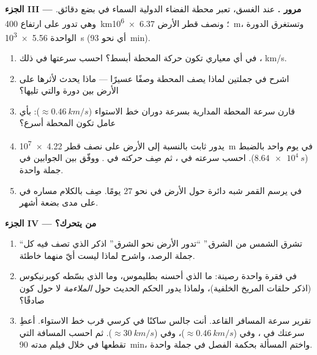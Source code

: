 \begin{problem}
\medskip
\noindent\textbf{الجزء III --- مرور .}
عند الغسق، تعبر محطة الفضاء الدولية السماء في بضع
دقائق. وهي تدور على ارتفاع \qty{400}{km}؛ ونصف قطر الأرض
\qty{6.37e6}{m}، وتستغرق الدورة الواحدة \qty{5.56e3}{s} (أي نحو
\qty{93}{min}).
\begin{enumerate}[resume]
  \item في أي  معياري تكون حركة المحطة أبسط؟
        احسب سرعتها في ذلك ،  \unit{km/s}.
  \item اشرح في جملتين لماذا يصف 
        المحطة وصفًا عسيرًا --- ماذا يحدث لأثرها على الأرض
        بين دورة والتي تليها؟
  \item قارن سرعة المحطة المدارية بسرعة دوران
        خط الاستواء ($\approx \qty{0.46}{km/s}$): بأي عامل تكون
        المحطة أسرع؟
  \item يدور  ثابت بالنسبة إلى الأرض على نصف قطر \qty{4.22e7}{m} في
        يوم واحد بالضبط ($\qty{8.64e4}{s}$). احسب سرعته في
        ، ثم صِف حركته في .
        ووفّق بين الجوابين في جملة واحدة.
  \item في  يرسم القمر شبه دائرة حول
        الأرض في نحو $27$ يومًا. صِف بالكلام مساره في
         على مدى بضعة أشهر.
\end{enumerate}

\medskip
\noindent\textbf{الجزء IV --- من يتحرك؟}
\begin{enumerate}[resume]
  \item ``تشرق الشمس من الشرق.'' ``تدور الأرض نحو
        الشرق.'' اذكر  الذي تصف فيه كل جملة
        الرصد، واشرح لماذا ليست أيّ منهما خاطئة.
  \item في فقرة واحدة رصينة: ما الذي أحسنه  بطليموس، وما
        الذي بسّطه  كوبرنيكوس (اذكر حلقات المريخ
        الخلفية)، ولماذا يدور الحكم الحديث حول \emph{الملاءمة}
        لا حول كون  صادقًا؟
  \item تقرير سرعة المسافر القاعد. أنت جالس ساكنًا في
        كرسي قرب خط الاستواء. أعطِ سرعتك في ،
        وفي  ($\approx \qty{0.46}{km/s}$)،
        وفي  ($\approx \qty{30}{km/s}$). ثم احسب
        المسافة التي تقطعها في  خلال
        فيلم مدته \qty{90}{min}، واختم المسألة بحكمة الفصل
        في جملة واحدة.
\end{enumerate}
\end{problem}
